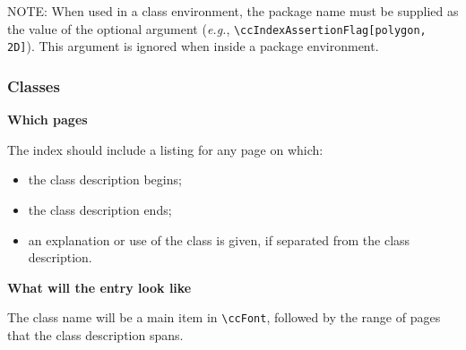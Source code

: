 \documentclass[11pt]{article}
\begin{document}
\begin{description}
\begin{itemize}
              NOTE: When used in a class environment, the package
              name must be supplied as the value of the optional argument 
              ({\em e.g.}, \verb|\ccIndexAssertionFlag[polygon, 2D]|).  This
              argument is ignored when inside a package environment.
       \end{itemize}


\end{description}

\subsubsection{Classes}
\label{classes}

\begin{description}
   \item{\bf Which pages}

         The index should include a listing for any page on which:
       \begin{itemize}
           \item the class description begins;
           \item the class description ends;
           \item an explanation or use of the class is given,
                 if separated from the class description.
       \end{itemize}

   \item{\bf What will the entry look like}

       The class name will be a main item in \verb|\ccFont|, followed by
       the range of pages that the class description spans. 
                 

\end{description}
\end{document}
